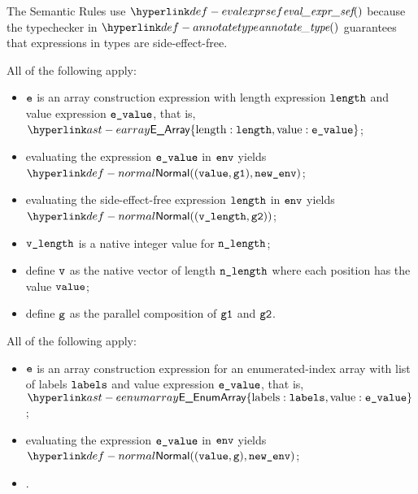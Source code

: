 The Semantic Rules use $\evalexprsef\empty$ because the typechecker in
$\annotatetype$ guarantees that expressions in types are side-effect-free.

\ProseParagraph
All of the following apply:
\begin{itemize}
  \item $\ve$ is an array construction expression with length expression $\elength$ and value expression $\evalue$,
        that is, $\EArray\{\EArrayLength: \elength, \EArrayValue: \evalue\}$;
  \item evaluating the expression $\evalue$ in $\env$ yields $\Normal((\vvalue, \vgone), \newenv)$\ProseOrAbnormal;
  \item evaluating the side-effect-free expression $\elength$ in $\env$ yields \\
        $\Normal((\vlength, \vgtwo))$\ProseOrError;
  \item $\vlength$ is a native integer value for $\nlength$;
  \item define $\vv$ as the native vector of length $\nlength$ where each position has the value $\vvalue$;
  \item define $\vg$ as the parallel composition of $\vgone$ and $\vgtwo$.
\end{itemize}

\FormallyParagraph
\begin{mathpar}
\end{mathpar}

\ProseParagraph
All of the following apply:
\begin{itemize}
  \item $\ve$ is an array construction expression for an enumerated-index array with
        list of labels $\vlabels$ and value expression $\evalue$,
        that is, \\
        $\EEnumArray\{\EArrayLabels: \vlabels, \EArrayValue: \evalue\}$;
  \item evaluating the expression $\evalue$ in $\env$ yields $\Normal((\vvalue, \vg), \newenv)$\ProseOrAbnormal;
  \item {}.
\end{itemize}

